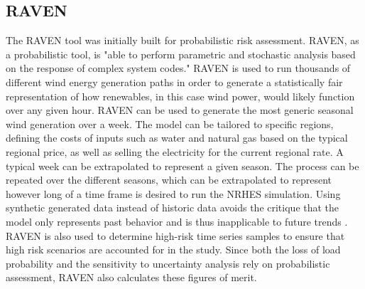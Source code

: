 \documentclass{article}                                                                           %
\begin{document}
\begin{linenumbers}
\subsection{RAVEN}
The RAVEN tool was initially built for probabilistic risk assessment. RAVEN, as a probabilistic tool, is "able to perform parametric and stochastic analysis based on the response of complex system codes\cite{RabitiRAVEN}." RAVEN is used to run thousands of different wind energy generation paths in order to generate a statistically fair representation of how renewables, in this case wind power, would likely function over any given hour. RAVEN can be used to generate the most generic seasonal wind generation over a week. The model can be tailored to specific regions, defining the costs of inputs such as water and natural gas based on the typical regional price, as well as selling the electricity for the current regional rate. A typical week can be extrapolated to represent a given season. The process can be repeated over the different seasons, which can be extrapolated to represent however long of a time frame is desired to run the NRHES simulation. Using synthetic generated data instead of historic data avoids the critique that the model only represents past behavior and is thus inapplicable to future trends \cite{redfoot_epiney_2016}. RAVEN is also used to determine high-risk time series samples to ensure that high risk scenarios are accounted for in the study. Since both the loss of load probability and the sensitivity to uncertainty analysis rely on probabilistic assessment, RAVEN also calculates these figures of merit. 


\end{linenumbers}
\end{document}
